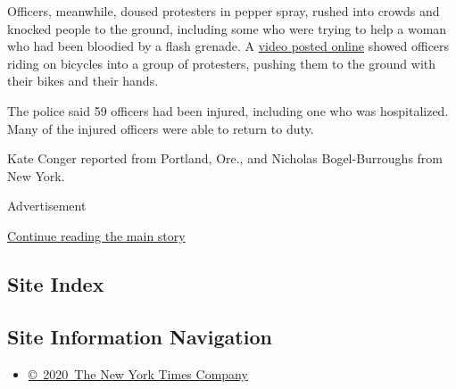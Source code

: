 Officers, meanwhile, doused protesters in pepper spray, rushed into
crowds and knocked people to the ground, including some who were trying
to help a woman who had been bloodied by a flash grenade. A
\href{https://twitter.com/slydesilva/status/1287240894219841536?s=20}{video
posted online} showed officers riding on bicycles into a group of
protesters, pushing them to the ground with their bikes and their hands.

The police said 59 officers had been injured, including one who was
hospitalized. Many of the injured officers were able to return to duty.

Kate Conger reported from Portland, Ore., and Nicholas Bogel-Burroughs
from New York.

Advertisement

\protect\hyperlink{after-bottom}{Continue reading the main story}

\hypertarget{site-index}{%
\subsection{Site Index}\label{site-index}}

\hypertarget{site-information-navigation}{%
\subsection{Site Information
Navigation}\label{site-information-navigation}}

\begin{itemize}
\tightlist
\item
  \href{https://help.nytimes3xbfgragh.onion/hc/en-us/articles/115014792127-Copyright-notice}{©~2020~The
  New York Times Company}
\end{itemize}

